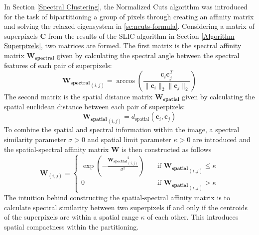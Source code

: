 In Section \ref{Spectral Clustering}, the Normalized Cuts algorithm was introduced for the task of bipartitioning a group of pixels through creating an affinity matrix and solving the relaxed eigensystem in \eqref{sc:ncuts-formula}. Considering a matrix of superpixels $\mathbf{C}$ from the results of the SLIC algorithm in Section \ref{Algorithm Superpixels}, two matrices are formed. The first matrix is the spectral affinity matrix $\mathbf{W_{\text{spectral}}}$ given by calculating the spectral angle between the spectral features of each pair of superpixels:
\begin{equation}
    \label{nc:spectral-mtx}
    \mathbf{W_{\text{spectral}}}_{(i,j)} = \arccos\left(\frac{\mathbf{c}_i \mathbf{c}_j^T}{\|\mathbf{c}_i\|_2\|\mathbf{c}_j\|_2}\right) 
\end{equation}
The second matrix is the spatial distance matrix $\mathbf{W_{\text{spatial}}}$ given by calculating the spatial euclidean distance between each pair of superpixels:
\begin{equation}
    \label{nc:spatial-mtx}
    \mathbf{W_{\text{spatial}}}_{(i,j)} = d_{\text{spatial}}(\mathbf{c}_i, \mathbf{c}_j) 
\end{equation}
To combine the spatial and spectral information within the image, a spectral similarity parameter $\sigma > 0$ and spatial limit parameter $\kappa > 0$ are introduced and the spatial-spectral affinity matrix $\mathbf{W}$ is then constructed as follows
\begin{equation}
    \label{nc:spatial-spectral-mtx}
    \mathbf{W}_{(i,j)} = \begin{cases}
        \exp\left(-\frac{\mathbf{W_{\text{spectral}}}_{(i,j)}^2}{\sigma^2}\right) &\quad \text{if } \mathbf{W_{\text{spatial}}}_{(i,j)} \leq \kappa\\
        0 &\quad \text{if } \mathbf{W_{\text{spatial}}}_{(i,j)} > \kappa 
    \end{cases}
\end{equation}
The intuition behind constructing the spatial-spectral affinity matrix is to calculate spectral similarity between two superpixels if and only if the centroids of the superpixels are within a spatial range $\kappa$ of each other. This introduces spatial compactness within the partitioning.

